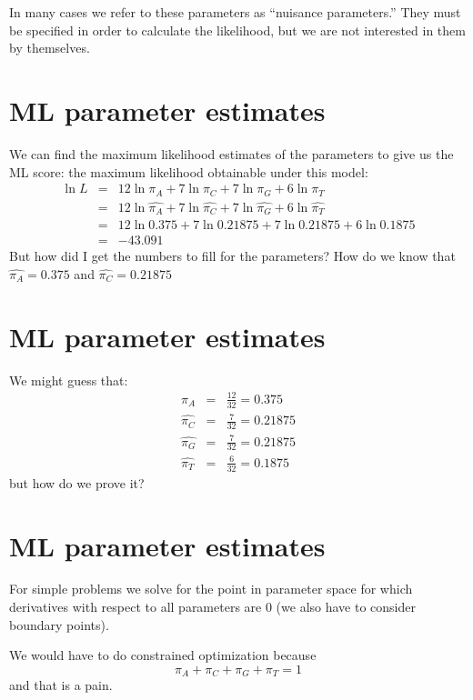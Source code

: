 \documentclass[landscape]{foils}
\begin{document}
In many cases we refer to these parameters as ``nuisance parameters.''
They must be specified in order to calculate the likelihood, but we are not interested in them by themselves.


\myNewSlide
\section*{ML parameter estimates}
\large
We can find the maximum likelihood estimates of the parameters to give us the ML score: the maximum likelihood obtainable under this model:
\begin{eqnarray*}
	\ln L & =  &  12 \ln\pi_A + 7 \ln\pi_C + 7 \ln\pi_G + 6 \ln\pi_T \\
	 & =  &  12 \ln\widehat{\pi_A} + 7 \ln\widehat{\pi_C} + 7 \ln\widehat{\pi_G} + 6 \ln\widehat{\pi_T} \\
	 & =  &  12 \ln0.375 + 7 \ln0.21875 + 7 \ln0.21875+ 6 \ln0.1875 \\
	 & =  & -43.091 
\end{eqnarray*}
But how did I get the numbers to fill for the parameters?
How do we know that $\widehat{\pi_A} = 0.375$ and $\widehat{\pi_C} = 0.21875$

\myNewSlide
\section*{ML parameter estimates}
We might guess that:
\begin{eqnarray*}
	\widehat{\pi_A} & = &  \frac{12}{32} = 0.375\\
	\widehat{\pi_C} & = &  \frac{7}{32} = 0.21875\\
	\widehat{\pi_G} & = &  \frac{7}{32} = 0.21875\\
	\widehat{\pi_T} & = &  \frac{6}{32} = 0.1875
\end{eqnarray*}
but how do we prove it?

\myNewSlide
\section*{ML parameter estimates}
For simple problems we solve for the point in parameter space for which derivatives with respect to all parameters are 0 (we also have to consider boundary points).

We would have to do constrained optimization because \[\pi_A + \pi_C + \pi_G + \pi_T = 1\]
and that is a pain.

\myNewSlide
\end{document}

